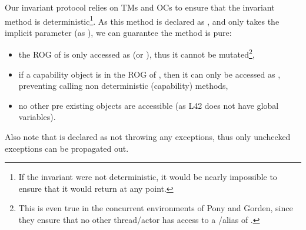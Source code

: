 
Our invariant protocol relies on TMs and OCs to ensure that the invariant method is deterministic\footnote{If the invariant were not deterministic, it would be nearly impossible to ensure that it would return \Q@true@ at any point.}.
As this method is declared as \Q@read@, and only takes the implicit parameter \Q@this@ (as \Q@read@), we can guarantee the method is pure:
\begin{itemize}
\item the ROG of \Q@this@ is only accessed as \Q@read@ (or \Q@imm@), thus it cannot be mutated\footnote{This is even true in the concurrent environments of Pony and Gorden, since they ensure that no other thread/actor has access to a \Q@mut@/\Q@capsule@ alias of \Q@this@.},
\item if a capability object is in the ROG of \Q@this@, then it can only be accessed as \Q@read@, preventing calling non deterministic (capability) methods,
\item no other pre existing objects are accessible (as L42 does not have global variables).
\end{itemize}

\noindent Also note that \Q@invariant@ is declared as not throwing any exceptions,
	thus only unchecked exceptions can be propagated out.


